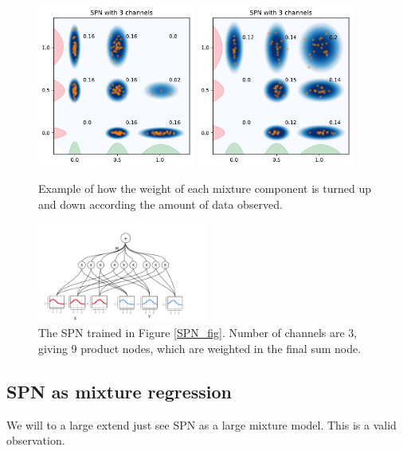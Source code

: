 \begin{figure}[H]
    \centering
    {\includegraphics[width=0.46\textwidth]{Pictures/SPN_illustration3.pdf} }%
    \qquad
   {\includegraphics[width=0.46\textwidth]{Pictures/SPN_illustration4.pdf} }%
    \caption{Example of how the weight of each mixture component is turned up and
    down according the amount of data observed.}
    \label{WeightedSPN}
\end{figure}



\begin{figure}
    \centering
    \includegraphics[width=0.5\textwidth]{Figures/SPN_graph2.pdf}
    \caption{The SPN trained in Figure \ref{SPN_fig}. Number of channels are
    3, giving 9 product nodes, which are weighted in the final sum node.}
\end{figure}

\subsection{SPN as mixture regression}
We will to a large extend just see SPN as a large mixture model. This is a valid observation. 

